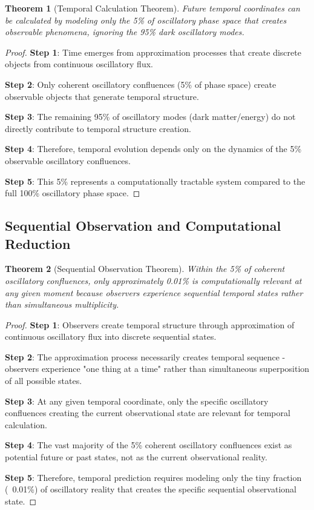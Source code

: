 \documentclass[11pt]{article}
\newtheorem{theorem}{Theorem}[section]
\theoremstyle{remark}
\begin{document}
\begin{theorem}[Temporal Calculation Theorem]
Future temporal coordinates can be calculated by modeling only the 5\% of oscillatory phase space that creates observable phenomena, ignoring the 95\% dark oscillatory modes.
\end{theorem}

\begin{proof}
\textbf{Step 1}: Time emerges from approximation processes that create discrete objects from continuous oscillatory flux.

\textbf{Step 2}: Only coherent oscillatory confluences (5\% of phase space) create observable objects that generate temporal structure.

\textbf{Step 3}: The remaining 95\% of oscillatory modes (dark matter/energy) do not directly contribute to temporal structure creation.

\textbf{Step 4}: Therefore, temporal evolution depends only on the dynamics of the 5\% observable oscillatory confluences.

\textbf{Step 5}: This 5\% represents a computationally tractable system compared to the full 100\% oscillatory phase space.
\end{proof}

\subsection{Sequential Observation and Computational Reduction}

\begin{theorem}[Sequential Observation Theorem]
Within the 5\% of coherent oscillatory confluences, only approximately 0.01\% is computationally relevant at any given moment because observers experience sequential temporal states rather than simultaneous multiplicity.
\end{theorem}

\begin{proof}
\textbf{Step 1}: Observers create temporal structure through approximation of continuous oscillatory flux into discrete sequential states.

\textbf{Step 2}: The approximation process necessarily creates temporal sequence - observers experience "one thing at a time" rather than simultaneous superposition of all possible states.

\textbf{Step 3}: At any given temporal coordinate, only the specific oscillatory confluences creating the current observational state are relevant for temporal calculation.

\textbf{Step 4}: The vast majority of the 5\% coherent oscillatory confluences exist as potential future or past states, not as the current observational reality.

\textbf{Step 5}: Therefore, temporal prediction requires modeling only the tiny fraction (~0.01\%) of oscillatory reality that creates the specific sequential observational state.
\end{proof}
\end{document}
